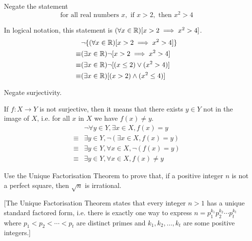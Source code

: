 \begin{exercise}
Negate the statement
\[ \text{for all real numbers } x, \text{ if } x>2, \text{ then } x^2>4 \]
\end{exercise}

\begin{solution}
In logical notation, this statement is $(\forall x \in \mathbb R)[x>2 \implies x^2>4]$.
\begin{align*}
&\lnot\{(\forall x\in\mathbb R)[x>2\implies x^2>4]\}\\
\equiv&(\exists x\in\mathbb R) \lnot[x>2\implies x^2>4] \\
\equiv&(\exists x\in\mathbb R) \lnot [(x\le2)\lor(x^2>4)] \\
\equiv&(\exists x\in\mathbb R) [(x>2)\land(x^2\le4)]
\end{align*}
\end{solution}

\begin{exercise}
Negate surjectivity.
\end{exercise}

\begin{solution}
If $f:X\to Y$ is not surjective, then it means that there exists $y \in Y$ not in the image of $X$, i.e. for all $x$ in $X$ we have $f(x)\neq y$.
\begin{align*}
&\lnot \forall y\in Y, \exists x\in X, f(x)=y\\
\equiv&\exists y\in Y, \lnot (\exists x\in X, f(x)=y)\\
\equiv&\exists y\in Y, \forall x\in X, \lnot (f(x)=y)\\
\equiv&\exists y\in Y, \forall x\in X, f(x) \neq y
\end{align*}
\end{solution}

\begin{exercise}
Use the Unique Factorisation Theorem to prove that, if a positive integer $n$ is not a perfect square, then $\sqrt{n}$ is irrational.

[The Unique Factorisation Theorem states that every integer $n>1$ has a unique standard factored form, i.e. there is exactly one way to express $n=p_1^{k_1}p_2^{k_2}\cdots p_t^{k_t}$ where $p_1<p_2<\cdots<p_t$ are distinct primes and $k_1,k_2,\dots,k_t$ are some positive integers.]
\end{exercise}


